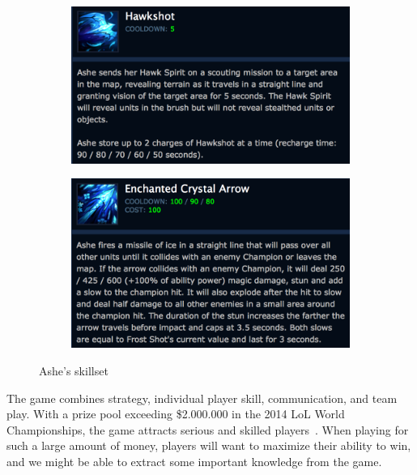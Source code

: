 \begin{figure}
\begin{subfigure}[b]{0.3\textwidth}
                \caption{}
                \label{fig:volley}
        \end{subfigure}
        \begin{subfigure}[b]{0.3\textwidth}
                \includegraphics[width=\textwidth]{img/hawkshot.png}
                \caption{}
                \label{fig:hawkshot}
        \end{subfigure}
                \begin{subfigure}[b]{0.3\textwidth}
                \includegraphics[width=\textwidth]{img/enchanted.png}
                \caption{}
                \label{fig:enchanted}
        \end{subfigure}
        \caption{Ashe's skillset}\label{fig:ashe}
\end{figure}

The game combines strategy, individual player skill, communication, and team play. With a prize pool exceeding \$2.000.000 in the 2014 LoL World Championships, the game attracts serious and skilled players~\cite{lolprize}. When playing for such a large amount of money, players will want to maximize their ability to win, and we might be able to extract some important knowledge from the game.














